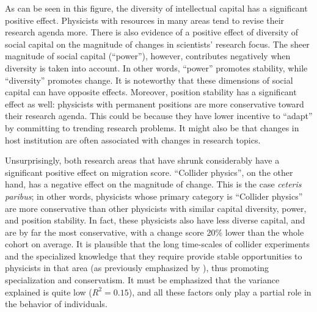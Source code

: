 \documentclass{article}
\begin{document}
As can be seen in this figure, the diversity of intellectual capital has a significant positive effect. Physicists with resources in many areas tend to revise their research agenda more. There is also evidence of a positive effect of diversity of social capital on the magnitude of changes in scientists' research focus. The sheer magnitude of social capital (``power''), however, contributes negatively when diversity is taken into account. In other words, ``power'' promotes stability, while ``diversity'' promotes change. It is noteworthy that these dimensions of social capital can have opposite effects. Moreover, position stability has a significant effect as well: physicists with permanent positions are more conservative toward their research agenda. This could be because they have lower incentive to ``adapt'' by committing to trending research problems. It might also be that changes in host institution are often associated with changes in research topics.

Unsurprisingly, both research areas that have shrunk considerably have a significant positive effect on migration score. ``Collider physics'', on the other hand, has a negative effect on the magnitude of change. This is the case \textit{ceteris paribus}; in other words, physicists whose primary category is ``Collider physics'' are more conservative than other physicists with similar capital diversity, power, and position stability. In fact, these physicists also have less diverse capital, and are by far the most conservative, with a change score 20\% lower than the whole cohort on average. It is plausible that the long time-scales of collider experiments and the specialized knowledge that they require provide stable opportunities to physicists in that area (as previously emphasized by \citealt[p.~138]{galison1987how}), thus promoting specialization and conservatism. It must be emphasized that the variance explained is quite low ($R^2=0.15$), and all these factors only play a partial role in the behavior of individuals.
\end{document}
